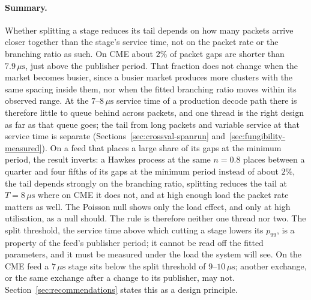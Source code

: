 \documentclass[11pt]{article}
\begin{document}
\paragraph{Summary.} Whether splitting a stage reduces its tail depends on how
many packets arrive closer together than the stage's service time, not on the packet rate
or the branching ratio as such. On CME about $2\%$ of packet gaps are shorter than
$7.9\,\mu\mathrm{s}$, just above the publisher period. That fraction does
not change when the market becomes busier, since a busier market produces more clusters
with the same spacing inside them, nor when the fitted branching ratio moves within its
observed range. At the $7$--$8\,\mu\mathrm{s}$ service time of a production decode path there is
therefore little to queue behind across packets, and one thread is the right design as far as
that queue goes; the tail from long packets and variable service at that service time is
separate (Sections~\ref{sec:crossval-spanrun} and~\ref{sec:fungibility-measured}). On a feed that
places a large share of its gaps at the minimum period, the result inverts: a Hawkes process at the
same $n = 0.8$ places between a quarter and four fifths of its gaps at the minimum period instead of about $2\%$, the tail
depends strongly on the branching ratio, splitting reduces the tail at $T =
8\,\mu\mathrm{s}$ where on CME it does not, and at high enough load the packet rate
matters as well. The Poisson null shows only the load effect, and only at high
utilisation, as a null should. The rule is therefore neither one thread nor two. The
split threshold, the service time above which cutting a stage lowers its $p_{99}$, is a
property of the feed's publisher period; it cannot be read off the fitted parameters, and
it must be measured under the load the system will see. On the CME feed a
$7\,\mu\mathrm{s}$ stage sits below the split threshold of $9$--$10\,\mu\mathrm{s}$; another exchange, or the same
exchange after a change to its publisher, may not. Section~\ref{sec:recommendations} states this as
a design principle.
\end{document}
